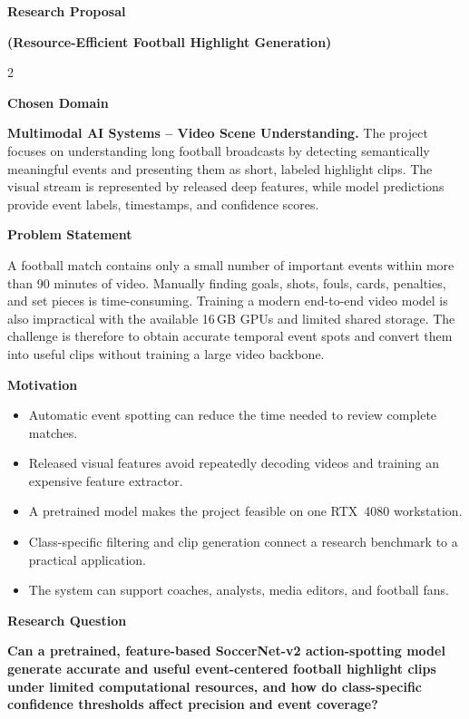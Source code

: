 \documentclass[10pt,a4paper]{article}
\newcommand{\sectiontitle}[1]{%
  \vspace{4pt}\par{\fontsize{15}{17}\selectfont\bfseries #1}\par\vspace{3pt}%
}
\begin{document}
{\fontsize{20}{22}\selectfont\bfseries Research Proposal}\par
{\fontsize{14}{16}\selectfont\bfseries (Resource-Efficient Football Highlight Generation)}

\vspace{5pt}
\begin{multicols}{2}
\raggedright

\sectiontitle{Chosen Domain}

\textbf{Multimodal AI Systems -- Video Scene Understanding.}
The project focuses on understanding long football broadcasts by detecting semantically meaningful events and presenting them as short, labeled highlight clips. The visual stream is represented by released deep features, while model predictions provide event labels, timestamps, and confidence scores.

\sectiontitle{Problem Statement}

A football match contains only a small number of important events within more than 90 minutes of video. Manually finding goals, shots, fouls, cards, penalties, and set pieces is time-consuming. Training a modern end-to-end video model is also impractical with the available 16\,GB GPUs and limited shared storage. The challenge is therefore to obtain accurate temporal event spots and convert them into useful clips without training a large video backbone.

\sectiontitle{Motivation}

\begin{itemize}
  \item Automatic event spotting can reduce the time needed to review complete matches.
  \item Released visual features avoid repeatedly decoding videos and training an expensive feature extractor.
  \item A pretrained model makes the project feasible on one RTX~4080 workstation.
  \item Class-specific filtering and clip generation connect a research benchmark to a practical application.
  \item The system can support coaches, analysts, media editors, and football fans.
\end{itemize}

\sectiontitle{Research Question}

\textbf{Can a pretrained, feature-based SoccerNet-v2 action-spotting model generate accurate and useful event-centered football highlight clips under limited computational resources, and how do class-specific confidence thresholds affect precision and event coverage?}


\end{multicols}
\end{document}
